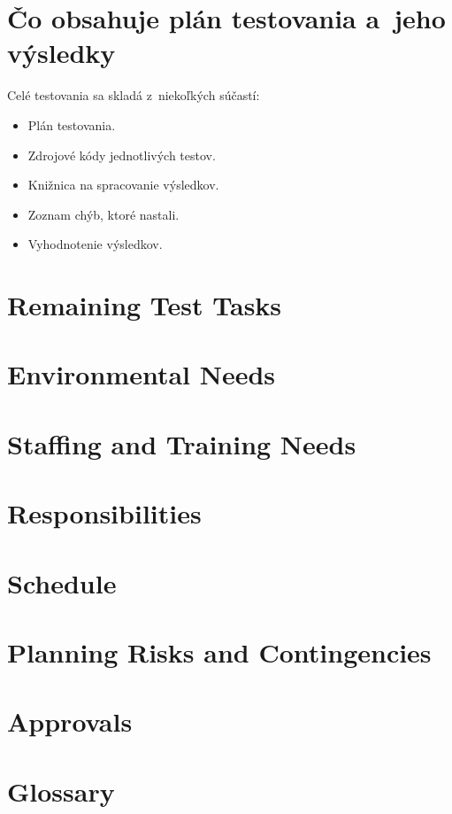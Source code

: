 \section{Čo obsahuje plán testovania a~jeho výsledky}

Celé testovania sa skladá z~niekoľkých súčastí:

\begin{itemize}
    \item Plán testovania.
    \item Zdrojové kódy jednotlivých testov.
    \item Knižnica na spracovanie výsledkov.
    \item Zoznam chýb, ktoré nastali.
    \item Vyhodnotenie výsledkov.
\end{itemize}

\section{Remaining Test Tasks}
\section{Environmental Needs}
\section{Staffing and Training Needs}
\section{Responsibilities}
\section{Schedule}
\section{Planning Risks and Contingencies}
\section{Approvals}
\section{Glossary}

